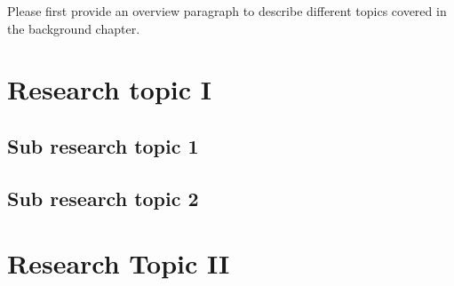 





Please first provide an overview paragraph to describe different topics covered in the background chapter. \lipsum[6]

\section{Research topic I}
\label{sec::ch2::autonomous-exploration}

\subsection{Sub research topic 1}
\label{sec::ch2::information-exploration}
\lipsum[7]
\subsection{Sub research topic 2}
\label{sec::ch2::learning-exploration}
\lipsum[8]


\section{Research Topic II}
\label{sec::ch2::slam}
\lipsum[9-10]